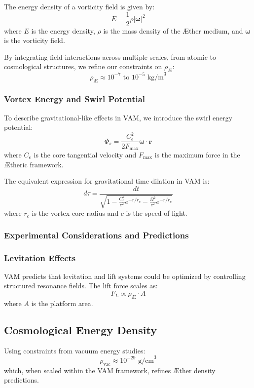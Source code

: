         The energy density of a vorticity field is given by:
        \[ E = \frac{1}{2} \rho |\mathbf{\omega}|^2 \]
        where $E$ is the energy density, $\rho$ is the mass density of the \AE{}ther medium, and $\mathbf{\omega}$ is the vorticity field.

        By integrating field interactions across multiple scales, from atomic to cosmological structures, we refine our constraints on $\rho_\text{\AE}$:
        \[ \rho_\text{\AE} \approx 10^{-7} \text{ to } 10^{-5} \text{ kg/m}^3 \]


        \subsubsection{Vortex Energy and Swirl Potential}\label{sec:vortex-energy-and-swirl-potential}

        To describe gravitational-like effects in VAM, we introduce the swirl energy potential:
        \[ \Phi_s = \frac{C_e^2}{2F_{\text{max}}} \mathbf{\omega} \cdot \mathbf{r} \]
        where $C_e$ is the core tangential velocity and $F_{\text{max}}$ is the maximum force in the \AE{}theric framework.

        The equivalent expression for gravitational time dilation in VAM is:
        \[ d\tau = \frac{dt}{\sqrt{1 - \frac{C_e^2}{c^2} e^{-r/r_c} - \frac{\Omega^2}{c^2} e^{-r/r_c}}} \]
        where $r_c$ is the vortex core radius and $c$ is the speed of light.


        \subsubsection{Experimental Considerations and Predictions}\label{sec:experimental-considerations-and-predictions}

        \subsubsection{Levitation Effects}\label{subsec:levitation-effects}
        VAM predicts that levitation and lift systems could be optimized by controlling structured resonance fields. The lift force scales as:
        \[ F_L \propto \rho_\text{\AE} \cdot A \]
        where $A$ is the platform area.

        \subsection{Cosmological Energy Density}\label{subsec:cosmological-energy-density}
        Using constraints from vacuum energy studies:
        \[ \rho_\text{vac} \approx 10^{-29} \text{ g/cm}^3 \]
        which, when scaled within the VAM framework, refines \AE{}ther density predictions.


